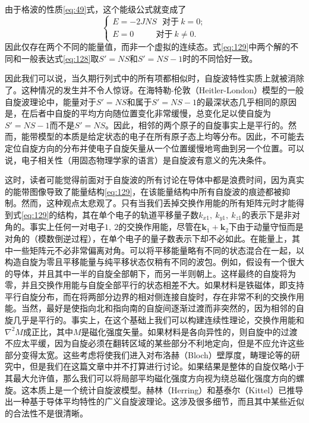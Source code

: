 \documentclass{article}
\begin{document}
由于格波的性质\eqref{eq:49}式，这个能级公式就变成了
\begin{equation} \label{eq:129}
\left\{
\begin{array}{l}
E=-2JNS~~~\text{对于}~k=0;\\
E=0~~~~~~~~~~~~\text{对于}~k\neq 0.
\end{array}
\right.
\end{equation}
因此仅存在两个不同的能量值，而非一个虚拟的连续态。式\eqref{eq:129}中两个解的不同和一般表达式\eqref{eq:128}取$S'=NS$和$S'=NS-1$时的不同恰好一致。

因此我们可以说，当久期行列式中的所有项都相似时，自旋波特性实质上就被消除了。这种情况的发生并不令人惊讶。在海特勒-伦敦（Heitler-London）模型的一般自旋波理论中，能量对于$S'=NS$和属于$S'=NS-1$的最深状态几乎相同的原因是，在后者中自旋的平均方向随位置变化非常缓慢，总变化足以使自旋为$S'=NS-1$而不是$S'=NS$。因此，相邻的两个原子的自旋事实上是平行的。然而，能带模型的本质是给定状态的电子在所有原子态上均等分布。因此，不可能去定位自旋方向的分布并使电子自旋矢量从一个位置缓慢地弯曲到另一个位置。可以说，电子相关性（用固态物理学家的语言）是自旋波有意义的先决条件。

这时，读者可能觉得前面对于自旋波的所有讨论在导体中都是浪费时间，因为真实的能带图像导致了能量结构\eqref{eq:129}，在该能量结构中所有自旋波的痕迹都被抑制。然而，这种观点太悲观了。只有当我们丢掉交换作用能的所有矩阵元时才能得到式\eqref{eq:129}的结构，其在单个电子的轨道平移量子数$k_{x1},~k_{y1},~k_{z1}$的表示下是非对角的。事实上任何一对电子$1,~2$的交换作用能，尽管在$\mathbf{k}_1+\mathbf{k}_2$下由于动量守恒而是对角的（模数倒逆过程），在单个电子的量子数表示下却不必如此。在能量上，其中一些矩阵元不必非常偏离对角。可以将平移能量略有不同的状态混合在一起，以构造自旋为零且平移能量与纯平移状态仅稍有不同的波包。例如，假设有一个很大的导体，并且其中一半的自旋全部朝下，而另一半则朝上。这样最终的自旋将为零，并且交换作用能与自旋全部平行的状态相差不大。如果材料是铁磁体，即支持平行自旋分布，而在将两部分边界的相对侧连接自旋时，存在非常不利的交换作用能。当然，最好是使指向北和指向南的自旋间逐渐过渡而非突然的，因为相邻的自旋几乎是平行的。事实上，在这个基础上我们可以构建连续性理论，交换作用能和$\nabla^2M$成正比，其中$M$是磁化强度矢量。如果材料是各向异性的，则自旋中的过渡不应太平缓，因为自旋必须在翻转区域的某些部分不利地定向，但是不应允许这些部分变得太宽。这些考虑将使我们进入对布洛赫（Bloch）壁厚度，畴理论等的研究中，但是我们在这篇文章中并不打算进行讨论。如果结果是整体的自旋仅略小于其最大允许值，那么我们可以将局部平均磁化强度方向视为绕总磁化强度方向的螺旋。这本质上是一个统计自旋波模型。赫林（Herring）和基泰尔（Kittel）已推导出一种基于导体平均特性的广义自旋波理论。这涉及很多细节，而且其中某些近似的合法性不是很清晰。
\end{document}
